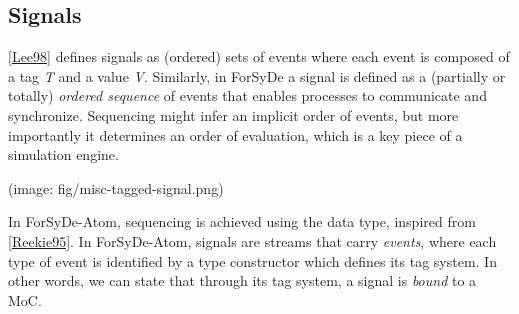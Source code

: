 \subsection{Signals}
\href{#lee98}{[Lee98]} defines signals as (ordered) sets of events
 where each event is composed of a tag \emph{T} and a value
 \emph{V}. Similarly, in ForSyDe a signal is defined as a (partially or
 totally) \emph{ordered sequence} of events that enables processes to
 communicate and synchronize. Sequencing might infer an implicit
 order of events, but more importantly it determines an order of
 evaluation, which is a key piece of a simulation engine.\par
(image: fig/misc-tagged-signal.png)\par
In ForSyDe-Atom, sequencing is achieved using the  data
 type, inspired from \href{#reekie95}{[Reekie95]}. In ForSyDe-Atom,
 signals are streams that carry \emph{events}, where each type of event
 is identified by a type constructor which defines its tag
 system. In other words, we can state that through its tag system,
 a signal is \emph{bound} to a MoC.\par

